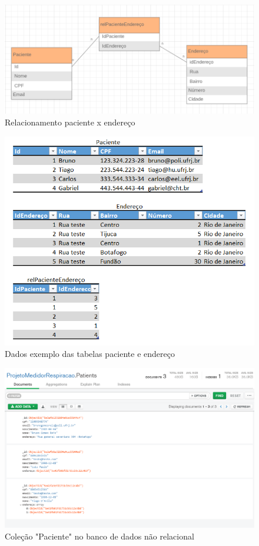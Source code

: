 \begin{figure}[h!]
	\begin{center}
		\includegraphics[width=0.3\linewidth]{images/bd_relacional_final.png}
		\caption{Relacionamento paciente x endereço}
		\label{fig:bd_relacional_final}
	\end{center}
\end{figure}

\begin{figure}[h!]
	\begin{center}
		\includegraphics[width=0.8\linewidth]{images/bd_relacional_dados_finalpng.png}
		\caption{Dados exemplo das tabelas paciente e endereço}
		\label{fig:bd_relacional_dados_finalpng}
	\end{center}
\end{figure}

\begin{figure}[h!]
	\begin{center}
		\includegraphics[width=0.8\linewidth]{images/bd_nao_relacional_Pacientes.png}
		\caption{Coleção "Paciente" no banco de dados não relacional}
		\label{fig:bd_nao_relacional_Pacientes}
	\end{center}
\end{figure}

